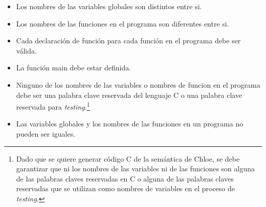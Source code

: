 \begin{itemize}
  \item{Los nombres de las variables globales son distintos entre si.}
  \item{Los nombres de las funciones en el programa son diferentes entre si.}
  \item{Cada declaración de función para cada función en el programa debe ser válida.}
  \item{La función main debe estar definida.}
  \item{Ninguno de los nombres de las variables o nombres de funcion en el programa debe ser una palabra clave reservada del lenguaje C o una palabra clave reservada para \textit{testing}.\footnote{Dado que se quiere generar código C de la semántica de Chloe, se debe garantizar que ni los nombres de las variables ni de las funciones son alguna de las palabras claves reservadas en C o alguna de las palabras claves reservadas que se utilizan como nombres de variables en el proceso de \textit{testing}.}}
  \item{Las variables globales y los nombres de las funciones en un programa no pueden ser iguales.}
\end{itemize}



